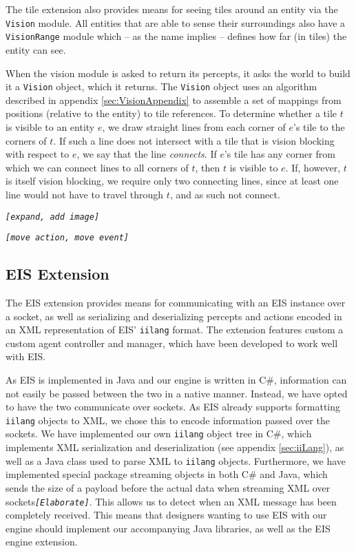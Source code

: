 The tile extension also provides means for seeing tiles around an
entity via the \texttt{Vision} module. All entities that are able
to sense their surroundings also have a \texttt{VisionRange} module
which -- as the name implies -- defines how far (in tiles) the entity
can see.

When the vision module is asked to return its percepts, it asks the
world to build it a \texttt{Vision} object, which it returns. The
\texttt{Vision} object uses an algorithm described in appendix \ref{sec:VisionAppendix}
to assemble a set of mappings from positions (relative to the entity)
to tile references. To determine whether a tile $t$ is visible to
an entity $e$, we draw straight lines from each corner of $e$'s
tile to the corners of $t$. If such a line does not intersect with
a tile that is vision blocking with respect to $e$, we say that the
line \emph{connects}. If $e$'s tile has any corner from which we
can connect lines to all corners of $t$, then $t$ is visible to
$e$. If, however, $t$ is itself vision blocking, we require only
two connecting lines, since at least one line would not have to travel
through $t$, and as such not connect.

\texttt{\emph{{[}expand, add image{]}}}

\texttt{\emph{{[}move action, move event{]}}}


\subsection{EIS Extension\label{sub:EIS-Extension}}

The EIS extension provides means for communicating with an EIS instance
over a socket, as well as serializing and deserializing percepts and
actions encoded in an XML representation of EIS' \texttt{iilang} format.
The extension features custom a custom agent controller and manager,
which have been developed to work well with EIS. 

As EIS is implemented in Java and our engine is written in C\#, information
can not easily be passed between the two in a native manner. Instead,
we have opted to have the two communicate over sockets. As EIS already
supports formatting \texttt{iilang} objects to XML, we chose this
to encode information passed over the sockets. We have implemented
our own \texttt{iilang} object tree in C\#, which implements XML serialization
and deserialization (see appendix \ref{sec:iiLang}), as well as a
Java class used to parse XML to \texttt{iilang} objects. Furthermore,
we have implemented special package streaming objects in both C\#
and Java, which sends the size of a payload before the actual data
when streaming XML over sockets\texttt{\emph{{[}Elaborate{]}}}. This
allows us to detect when an XML message has been completely received.
This means that designers wanting to use EIS with our engine should
implement our accompanying Java libraries, as well as the EIS engine
extension.

